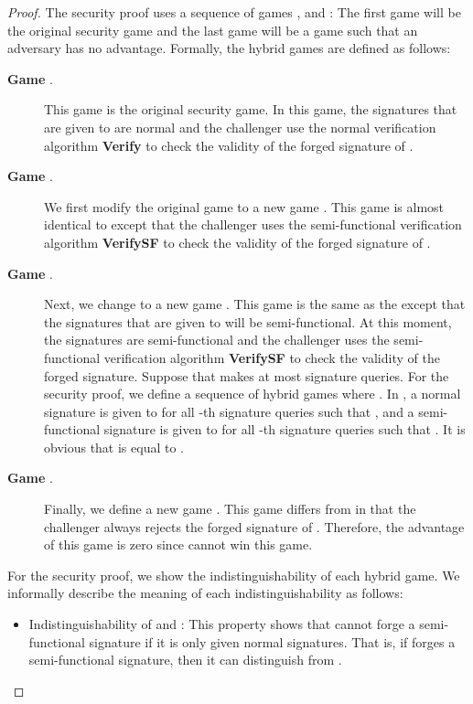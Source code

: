 \documentclass[11pt,letterpaper]{article}
\begin{document}
\begin{proof}
The security proof uses a sequence of games ,
and : The first game  will be the original security game
and the last game  will be a game such that an adversary 
has no advantage. Formally, the hybrid games are defined as follows:

\begin{description}
\item [\textbf{Game} .] This game is the original security game.
    In this game, the signatures that are given to  are normal and
    the challenger use the normal verification algorithm \textbf{Verify} to
    check the validity of the forged signature of .

\item [\textbf{Game} .] We first modify the original game to a
    new game . This game is almost identical to  except
    that the challenger uses the semi-functional verification algorithm
    \textbf{VerifySF} to check the validity of the forged signature of
    .

\item [\textbf{Game} .] Next, we change  to a new game
    . This game is the same as the  except that the
    signatures that are given to  will be semi-functional. At this
    moment, the signatures are semi-functional and the challenger uses the
    semi-functional verification algorithm \textbf{VerifySF} to check the
    validity of the forged signature. Suppose that  makes at most
     signature queries. For the security proof, we define a sequence of
    hybrid games 
    where . In , a normal signature
    is given to  for all -th signature queries such that , and a semi-functional signature is given to  for all -th
    signature queries such that . It is obvious that
     is equal to .

\item [\textbf{Game} .] Finally, we define a new game .
    This game differs from  in that the challenger always rejects
    the forged signature of . Therefore, the advantage of this game
    is zero since  cannot win this game.
\end{description}

For the security proof, we show the indistinguishability of each hybrid game.
We informally describe the meaning of each indistinguishability as follows:
\begin{itemize}
\item Indistinguishability of  and : This property
    shows that  cannot forge a semi-functional signature if it is
    only given normal signatures. That is, if  forges a
    semi-functional signature, then it can distinguish  from
    .


\end{itemize}
\end{proof}
\end{document}
